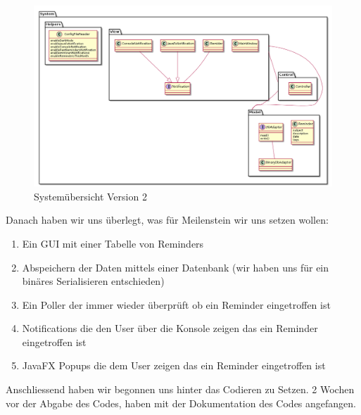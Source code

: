\documentclass[11pt,titelpage]{scrartcl}
\begin{document}
\begin{figure}
  \centering
    \includegraphics[width=1\textwidth]{../uml/uebersicht01.png}
  \caption{Systemübersicht Version 2}
  \label{fig:overview}
\end{figure}
Danach haben wir uns überlegt, was für Meilenstein wir uns setzen wollen:
\begin{enumerate}
  \item Ein GUI mit einer Tabelle von Reminders
  \item Abspeichern der Daten mittels einer Datenbank (wir haben uns für ein binäres Serialisieren entschieden)
  \item Ein Poller der immer wieder überprüft ob ein Reminder eingetroffen ist
  \item Notifications die den User über die Konsole zeigen das ein Reminder eingetroffen ist
  \item JavaFX Popups die dem User zeigen das ein Reminder eingetroffen ist
\end{enumerate}
Anschliessend haben wir begonnen uns hinter das Codieren zu Setzen. 2 Wochen vor der Abgabe des Codes, haben mit der Dokumentation des Codes angefangen.
\end{document}
